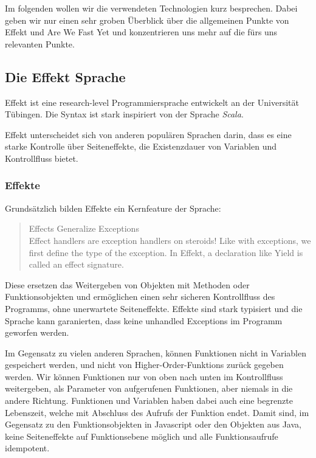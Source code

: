 Im folgenden wollen wir die verwendeten Technologien kurz besprechen.
Dabei geben wir nur einen sehr groben Überblick über die allgemeinen Punkte von Effekt und Are We Fast Yet und konzentrieren uns mehr auf die fürs uns relevanten Punkte.

\subsection{ Die Effekt Sprache  }	
Effekt ist eine research-level Programmiersprache entwickelt an der Universität Tübingen.
Die Syntax ist stark inspiriert von der Sprache \textit{Scala}.

Effekt unterscheidet sich von anderen populären Sprachen darin, dass es eine starke Kontrolle über Seiteneffekte, die Existenzdauer von Variablen und Kontrollfluss bietet.

\subsubsection{ Effekte }

Grundsätzlich bilden Effekte ein Kernfeature der Sprache:
\begin{quote}
    Effects Generalize Exceptions\\
    Effect handlers are exception handlers on steroids! Like with exceptions, we first define the type of the exception. In Effekt, a declaration like Yield is called an effect signature.
\end{quote}

Diese ersetzen das Weitergeben von Objekten mit Methoden oder Funktionsobjekten und ermöglichen einen sehr sicheren Kontrollfluss des Programms, ohne unerwartete Seiteneffekte.
Effekte sind stark typisiert und die Sprache kann garanierten, dass keine unhandled Exceptions im Programm geworfen werden.

Im Gegensatz zu vielen anderen Sprachen, können Funktionen nicht in Variablen gespeichert werden, und nicht von Higher-Order-Funktions zurück gegeben werden. Wir können Funktionen nur von oben nach unten im Kontrollfluss weitergeben, als Parameter von aufgerufenen Funktionen, aber niemals in die andere Richtung. Funktionen und Variablen haben dabei auch eine begrenzte Lebenszeit, welche mit Abschluss des Aufrufs der Funktion endet.
Damit sind, im Gegensatz zu den Funktionsobjekten in Javascript oder den Objekten aus Java, keine Seiteneffekte auf Funktionsebene möglich und alle Funktionsaufrufe idempotent.

